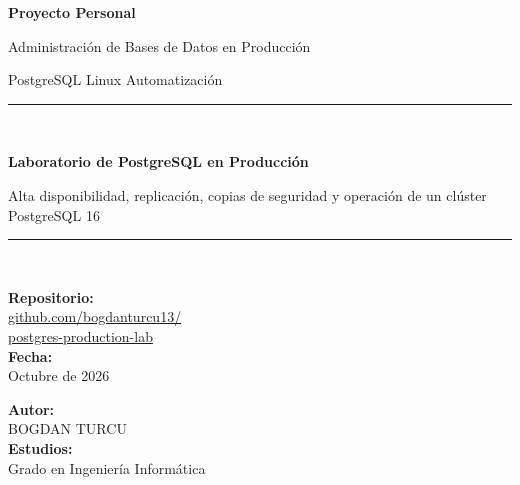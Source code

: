 \documentclass[11pt, a4paper, titlepage]{article}
\begin{document}
\hypersetup{pageanchor=false} %
\begin{titlepage}
    \centering
    \vspace*{1cm}
    {\Huge\bfseries Proyecto Personal\par}
    \vspace{0.5cm}
    {\Large Administración de Bases de Datos en Producción\par}
    \vspace{0.3cm}
    {\large PostgreSQL \textperiodcentered{} Linux \textperiodcentered{} Automatización\par}

    \vspace{2.5cm}
    \rule{\linewidth}{0.5mm} \\[0.4cm]
    {\huge\bfseries Laboratorio de PostgreSQL en Producción\par}
    \vspace{0.2cm}
    {\Large Alta disponibilidad, replicación, copias de seguridad y operación de un clúster PostgreSQL 16\par}
    \rule{\linewidth}{0.5mm} \\[1.5cm]

    \begin{minipage}{0.48\textwidth}
        \begin{flushleft} \large
            \textbf{Repositorio:}\\
            \small\href{https://github.com/bogdanturcu13/postgres-production-lab}{github.com/bogdanturcu13/\\postgres-production-lab}\\[0.3cm]
            \large\textbf{Fecha:}\\
            Octubre de 2026
        \end{flushleft}
    \end{minipage}
    \hfill
    \begin{minipage}{0.48\textwidth}
        \begin{flushright} \large
            \textbf{Autor:}\\
            BOGDAN TURCU\\[0.3cm]
            \textbf{Estudios:}\\
            Grado en Ingeniería Informática
        \end{flushright}
    \end{minipage}
\end{titlepage}
\hypersetup{pageanchor=true}
\end{document}
